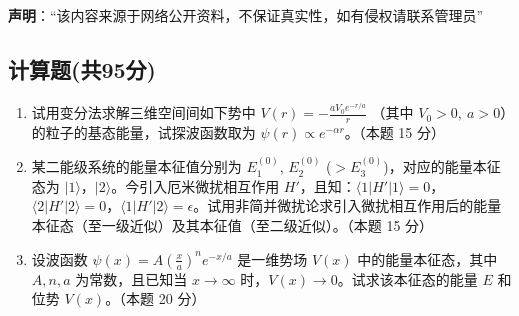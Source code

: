 
\textbf{声明}：“该内容来源于网络公开资料，不保证真实性，如有侵权请联系管理员”

\subsection{计算题(共95分)}
\begin{enumerate}
\item 试用变分法求解三维空间间如下势中 $V(r) = -\frac{aV_0 e^{-r/a}}{r}$ （其中 $V_0 > 0, \ a > 0$）的粒子的基态能量，试探波函数取为 $\psi(r) \propto e^{-\alpha r}$。（本题 15 分）
\item 某二能级系统的能量本征值分别为 $E_1^{(0)}$, $E_2^{(0)}$ ($ > E_3^{(0)}$)，对应的能量本征态为 $|1\rangle$，$|2\rangle$。今引入厄米微扰相互作用 $H'$，且知：$\langle 1|H'|1\rangle = 0$，$\langle 2|H'|2\rangle = 0$，$\langle 1|H'|2\rangle = \epsilon$。试用非简并微扰论求引入微扰相互作用后的能量本征态（至一级近似）及其本征值（至二级近似）。（本题 15 分）
\item 设波函数 $\psi(x) = A \left(\frac{x}{a}\right)^n e^{-x/a}$ 是一维势场 $V(x)$ 中的能量本征态，其中 $A, n, a$ 为常数，且已知当 $x \to \infty$ 时，$V(x) \to 0$。试求该本征态的能量 $E$ 和位势 $V(x)$。（本题 20 分）
\end{enumerate}
